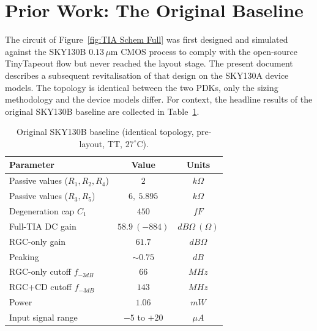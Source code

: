 \documentclass{article}
\begin{document}
\section{Prior Work: The Original Baseline}
\label{sec:prior}
The circuit of Figure~\ref{fig:TIA Schem Full} was first designed and simulated against the
SKY130B $0.13\,\mu$m CMOS process to comply with the open-source TinyTapeout flow but never reached the layout stage. The
present document describes a subsequent revitalisation of that design on the SKY130A device
models. The topology is identical
between the two PDKs, only the sizing methodology and the device models differ. For
context, the headline results of the original SKY130B baseline are collected in
Table~\ref{tab:baseline}.

\begin{table}[H]
    \centering
    \caption{Original SKY130B baseline (identical topology, pre-layout, TT, $27^\circ$C).}
    \label{tab:baseline}
    \begin{tabular}{l|c|c} \hline
        \textbf{Parameter} & \textbf{Value} & \textbf{Units} \\ \hline
        Passive values ($R_1,R_2,R_4$)        & $2$              & $k\Omega$ \\ \hline
        Passive values ($R_3,R_5$)            & $6,\ 5.895$      & $k\Omega$ \\ \hline
        Degeneration cap $C_1$                & $450$            & $fF$ \\ \hline
        Full-TIA DC gain                      & $58.9\ (-884)$   & $dB\Omega\ (\Omega)$ \\ \hline
        RGC-only gain                         & $61.7$           & $dB\Omega$ \\ \hline
        Peaking                               & $\sim0.75$       & $dB$ \\ \hline
        RGC-only cutoff $f_{-3dB}$            & $66$             & $MHz$ \\ \hline
        RGC+CD cutoff $f_{-3dB}$              & $143$            & $MHz$ \\ \hline
        Power                                 & $1.06$           & $mW$ \\ \hline
        Input signal range                    & $-5$ to $+20$    & $\mu A$ \\ \hline
    \end{tabular}
\end{table}
\end{document}
